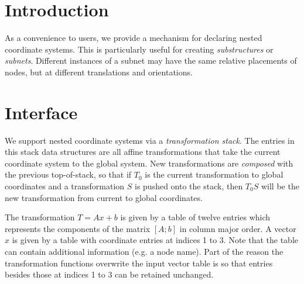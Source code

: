 
\section{Introduction}

As a convenience to users, we provide a mechanism for declaring
nested coordinate systems.  This is particularly useful
for creating \emph{substructures} or \emph{subnets}.  Different
instances of a subnet may have the same relative placements
of nodes, but at different translations and orientations.


\section{Interface}

We support nested coordinate systems via a \emph{transformation stack}.
The entries in this stack data structures are all affine transformations that
take the current coordinate system to the global system.  New transformations
are \emph{composed} with the previous top-of-stack, so that if
$T_0$ is the current transformation to global coordinates and a
transformation $S$ is pushed onto the stack, then $T_0 S$ will
be the new transformation from current to global coordinates.

The transformation $T = Ax + b$ is given by a table of twelve entries 
which represents the components of the matrix $[A; b]$ in column major 
order.  A vector $x$ is given by a table with coordinate entries at
indices 1 to 3.  Note that the table can contain additional information
(e.g. a node name).  Part of the reason the transformation functions
overwrite the input vector table is so that entries besides those
at indices 1 to 3 can be retained unchanged.

